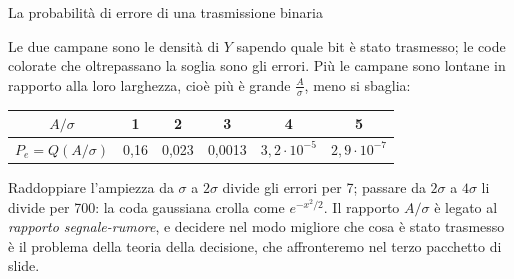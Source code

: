 \begin{esempio}{La probabilità di errore di una trasmissione binaria}
\begin{center}
\end{center}
Le due campane sono le densità di $Y$ sapendo quale bit è stato trasmesso; le code colorate che oltrepassano la soglia
sono gli errori. Più le campane sono lontane in rapporto alla loro larghezza, cioè più è grande $\frac{A}{\sigma}$, meno
si sbaglia:
\begin{center}
\renewcommand{\arraystretch}{1.25}
\begin{tabular}{@{}c|ccccc@{}}
  $A/\sigma$ & 1 & 2 & 3 & 4 & 5 \\ \hline
  $P_e = Q(A/\sigma)$ & 0,16 & 0,023 & 0,0013 & $3{,}2 \cdot 10^{-5}$ & $2{,}9 \cdot 10^{-7}$
\end{tabular}
\end{center}
Raddoppiare l'ampiezza da $\sigma$ a $2\sigma$ divide gli errori per 7; passare da $2\sigma$ a $4\sigma$ li divide per
700: la coda gaussiana crolla come $e^{-x^2/2}$. Il rapporto $A/\sigma$ è legato al \emph{rapporto segnale-rumore}, e
decidere nel modo migliore che cosa è stato trasmesso è il problema della teoria della decisione, che affronteremo nel
terzo pacchetto di slide.
\end{esempio}


